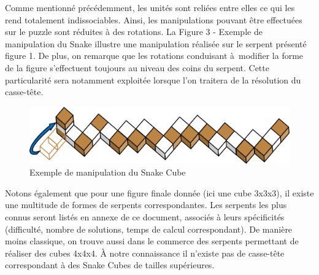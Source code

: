 \newpage Comme mentionné précédemment, les unités sont reliées entre elles ce qui les rend totalement indissociables. Ainsi, les manipulations pouvant être effectuées sur le puzzle sont réduites à des rotations. La Figure 3 - Exemple de manipulation du Snake illustre une manipulation réalisée sur le serpent présenté figure 1. De plus, on remarque que les rotations conduisant à modifier la forme de la figure s’effectuent toujours au niveau des coins du serpent. Cette particularité sera notamment exploitée lorsque l’on traitera de la résolution du casse-tête.

\begin{figure}[h]
 \centering
 \includegraphics[scale=0.3,keepaspectratio=true]{img/snakeCubeMove.png}
 \caption{Exemple de manipulation du Snake Cube}
\end{figure}

Notons également  que pour une figure finale donnée (ici une cube 3x3x3), il existe une multitude de formes de serpents correspondantes. Les serpents les plus connus seront listés en annexe de ce document, associés à leurs spécificités (difficulté, nombre de solutions, temps de calcul correspondant). De manière moins classique, on trouve aussi dans le commerce des serpents permettant de réaliser des cubes 4x4x4. À notre connaissance il n’existe pas de casse-tête correspondant à des Snake Cubes de tailles supérieures.